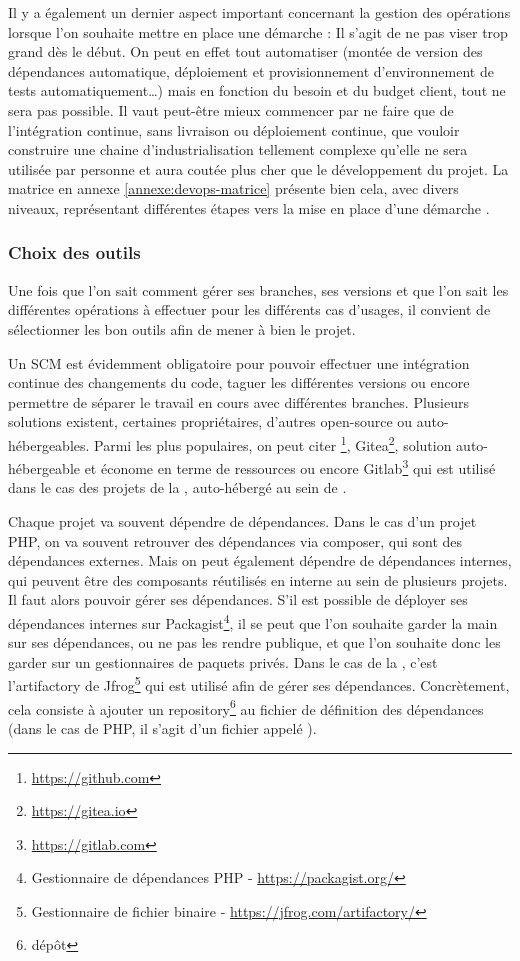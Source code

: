 Il y a également un dernier aspect important concernant la gestion des opérations lorsque l'on souhaite mettre en place une démarche \devops : Il s'agit de ne pas viser trop grand dès le début. On peut en effet tout automatiser (montée de version des dépendances automatique, déploiement et provisionnement d'environnement de tests automatiquement\ldots) mais en fonction du besoin et du budget client, tout ne sera pas possible. Il vaut peut-être mieux commencer par ne faire que de l'intégration continue, sans livraison ou déploiement continue, que vouloir construire une chaine d'industrialisation tellement complexe qu'elle ne sera utilisée par personne et aura coutée plus cher que le développement du projet. La matrice en annexe \ref{annexe:devops-matrice} présente bien cela, avec divers niveaux, représentant différentes étapes vers la mise en place d'une démarche \devops.

\subsubsection{Choix des outils}

Une fois que l'on sait comment gérer ses branches, ses versions et que l'on sait les différentes opérations à effectuer pour les différents cas d'usages, il convient de sélectionner les bon outils afin de mener à bien le projet.

Un \gls{SCM} est évidemment obligatoire pour pouvoir effectuer une intégration continue des changements du code, taguer les différentes versions ou encore permettre de séparer le travail en cours avec différentes branches. Plusieurs solutions existent, certaines propriétaires, d'autres open-source ou auto-hébergeables. Parmi les plus populaires, on peut citer \github\footnote{\url{https://github.com}}, Gitea\footnote{\url{https://gitea.io}}, solution auto-hébergeable et économe en terme de ressources ou encore Gitlab\footnote{\url{https://gitlab.com}} qui est utilisé dans le cas des projets de la \naq, auto-hébergé au sein de \onepoint.

Chaque projet va souvent dépendre de dépendances. Dans le cas d'un projet \gls{PHP}, on va souvent retrouver des dépendances via composer, qui sont des dépendances externes. Mais on peut également dépendre de dépendances internes, qui peuvent être des composants réutilisés en interne au sein de plusieurs projets. Il faut alors pouvoir gérer ses dépendances. S'il est possible de déployer ses dépendances internes sur Packagist\footnote{Gestionnaire de dépendances \gls{PHP} - \url{https://packagist.org/}}, il se peut que l'on souhaite garder la main sur ses dépendances, ou ne pas les rendre publique, et que l'on souhaite donc les garder sur un gestionnaires de paquets privés. Dans le cas de la \naq, c'est l'\gls{artifactory} de Jfrog\footnote{Gestionnaire de fichier binaire - \url{https://jfrog.com/artifactory/}} qui est utilisé afin de gérer ses dépendances. Concrètement, cela consiste à ajouter un repository\footnote{dépôt} au fichier de définition des dépendances (dans le cas de \gls{PHP}, il s'agit d'un fichier appelé ).


